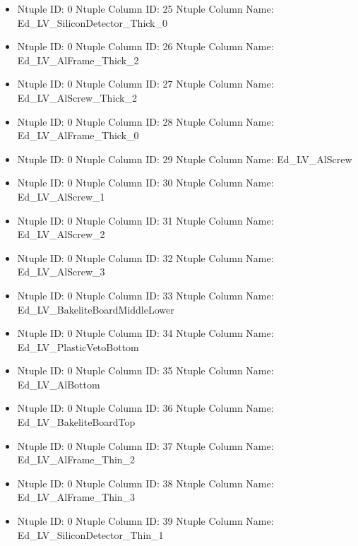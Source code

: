 \documentclass[8pt]{beamer}
\begin{document}
\begin{frame}
\begin{itemize}
        \item Ntuple ID: 0 Ntuple Column ID: 25 Ntuple Column Name: Ed\_LV\_SiliconDetector\_Thick\_0
        
        \item Ntuple ID: 0 Ntuple Column ID: 26 Ntuple Column Name: Ed\_LV\_AlFrame\_Thick\_2
        
        \item Ntuple ID: 0 Ntuple Column ID: 27 Ntuple Column Name: Ed\_LV\_AlScrew\_Thick\_2
        
        \item Ntuple ID: 0 Ntuple Column ID: 28 Ntuple Column Name: Ed\_LV\_AlFrame\_Thick\_0
        
        \item Ntuple ID: 0 Ntuple Column ID: 29 Ntuple Column Name: Ed\_LV\_AlScrew
        
        \item Ntuple ID: 0 Ntuple Column ID: 30 Ntuple Column Name: Ed\_LV\_AlScrew\_1
        
        \item Ntuple ID: 0 Ntuple Column ID: 31 Ntuple Column Name: Ed\_LV\_AlScrew\_2
        
        \item Ntuple ID: 0 Ntuple Column ID: 32 Ntuple Column Name: Ed\_LV\_AlScrew\_3
        
        \item Ntuple ID: 0 Ntuple Column ID: 33 Ntuple Column Name: Ed\_LV\_BakeliteBoardMiddleLower
        
        \item Ntuple ID: 0 Ntuple Column ID: 34 Ntuple Column Name: Ed\_LV\_PlasticVetoBottom
        
        \item Ntuple ID: 0 Ntuple Column ID: 35 Ntuple Column Name: Ed\_LV\_AlBottom
        
        \item Ntuple ID: 0 Ntuple Column ID: 36 Ntuple Column Name: Ed\_LV\_BakeliteBoardTop
        
        \item Ntuple ID: 0 Ntuple Column ID: 37 Ntuple Column Name: Ed\_LV\_AlFrame\_Thin\_2
        
        \item Ntuple ID: 0 Ntuple Column ID: 38 Ntuple Column Name: Ed\_LV\_AlFrame\_Thin\_3
        
        \item Ntuple ID: 0 Ntuple Column ID: 39 Ntuple Column Name: Ed\_LV\_SiliconDetector\_Thin\_1
        

\end{itemize}
\end{frame}
\end{document}
